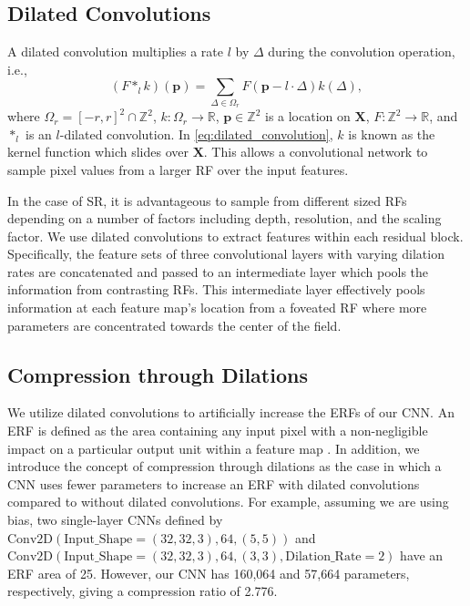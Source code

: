 \documentclass[runningheads]{llncs}
\begin{document}
\subsection{Dilated Convolutions}
\label{subsec:dilated_convolutions}
A dilated convolution multiplies a rate $l$ by $\Delta$ during the convolution 
operation, i.e.,
\begin{equation}
  (F\ast_lk)(\textbf{p}) = \sum\limits_{\Delta \in \Omega_r} F(\textbf{p} - l \cdot \Delta)k(\Delta),
  \label{eq:dilated_convolution}
\end{equation}
where $\Omega_r = [-r,r]^2 \cap \mathbb{Z}^2$, $k: \Omega_r \to \mathbb{R}$,
$\bm{p} \in \mathbb{Z}^2$ is a location on $\bm{X}$, $F: \mathbb{Z}^2 \to
\mathbb{R}$, and $*_l$ is an $l$-dilated convolution. In
\eqref{eq:dilated_convolution}, $k$ is known as the kernel function which
slides over $\bm{X}$. This allows a convolutional network to sample pixel
values from a larger RF over the input features. 

In the case of SR, it is advantageous to sample from different sized RFs 
depending on a number of factors including depth, resolution, and the 
scaling factor. We use dilated convolutions to extract features within each 
residual block. Specifically, the feature sets of three convolutional layers 
with varying dilation rates are concatenated and passed to an intermediate layer 
which pools the information from contrasting RFs. This intermediate layer 
effectively pools information at each feature map's location from a foveated RF 
where more parameters are concentrated towards the center of the field.

\subsection{Compression through Dilations}
\label{subsec:compression_through_dilations}
We utilize dilated convolutions to artificially increase the ERFs of our CNN. An
ERF is defined as the area containing any input pixel with a non-negligible
impact on a particular output unit within a feature map
\cite{luo2016understanding}. In addition, we introduce the concept of
compression through dilations as the case in which a CNN uses fewer parameters
to increase an ERF with dilated convolutions compared to without dilated
convolutions. For example, assuming we are using bias, two single-layer CNNs
defined by $\text{Conv2D}(\text{Input\_Shape}= (32,32,3),64,(5,5))$ and
$\text{Conv2D}(\text{Input\_Shape}=(32,32,3), 64,(3,3),\text{Dilation\_Rate}=2)$
have an ERF area of 25. However, our CNN has 160,064 and 57,664 parameters,
respectively, giving a compression ratio of 2.776.
\end{document}
